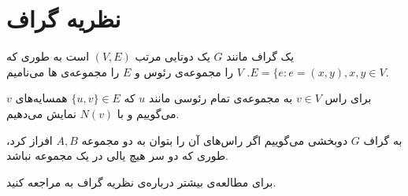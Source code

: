 \section{نظریه گراف}
\begin{definition}
یک گراف مانند
$G$
یک دوتایی مرتب
$(V, E)$
است به طوری که
$E = \{e: e = (x, y), x, y \in V$.
 $V$
را مجموعه‌ی رئوس و
$E$
را مجموعه‌ی 
ها
می‌نامیم.

برای راس
$v\in V$
به مجمو‌عه‌ی تمام رئوسی مانند
  $u$ 
  که
  $\{u,v\}\in E$ 
  همسایه‌های 
  $v$
  می‌گوییم و با
  $N(v)$
  نمایش می‌دهیم.
  
به گراف
$G$
دوبخشی می‌گوییم اگر راس‌های آن را بتوان به دو مجموعه 
$A, B$
افراز کرد، طوری که دو سر هیچ یالی در یک مجموعه نباشد.
\end{definition}
	برای مطالعه‌ی بیشتر درباره‌ی نظریه گراف به
\cite{west}
مراجعه کنید.

